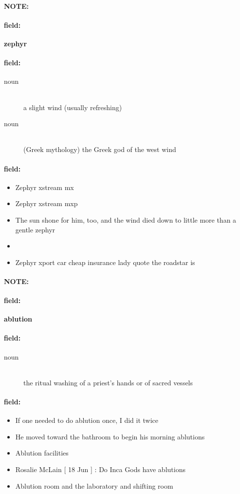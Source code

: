 \documentclass[12pt]{article}
\newenvironment{note}{\paragraph{NOTE:}}{}
\newenvironment{field}{\paragraph{field:}}{}
\begin{document}
\begin{note}
\begin{field}
\textbf{\large zephyr}
\end{field}


\begin{field}
\begin{description}
\item[noun] \hfill \\ 
a slight wind (usually refreshing)

\item[noun] \hfill \\ 
(Greek mythology) the Greek god of the west wind

\end{description}
\end{field}

\begin{field}
\begin{itemize}
\item Zephyr xstream mx
\item Zephyr xstream mxp
\item The sun shone for him, too, and the wind died down to little more than a gentle zephyr
\item 
\item Zephyr xport car cheap insurance lady quote the roadstar is
\end{itemize}
\end{field}
\end{note}
\begin{note}
\begin{field}
\textbf{\large ablution}
\end{field}


\begin{field}
\begin{description}
\item[noun] \hfill \\ 
the ritual washing of a priest's hands or of sacred vessels

\end{description}
\end{field}

\begin{field}
\begin{itemize}
\item If one needed to do ablution once, I did it twice
\item He moved toward the bathroom to begin his morning ablutions
\item Ablution facilities
\item Rosalie McLain [ 18 Jun ] : Do Inca Gods have ablutions
\item Ablution room and the laboratory and shifting room
\end{itemize}
\end{field}
\end{note}
\end{document}

